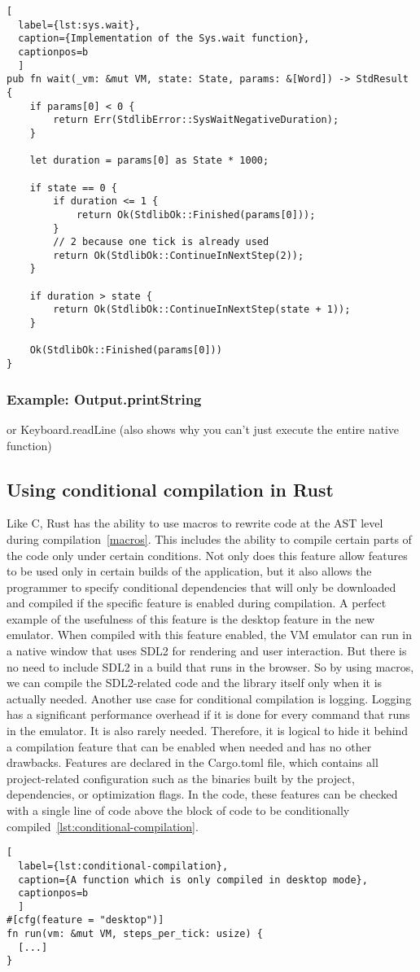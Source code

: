 \begin{lstlisting}[
  label={lst:sys.wait},
  caption={Implementation of the Sys.wait function},
  captionpos=b
  ]
pub fn wait(_vm: &mut VM, state: State, params: &[Word]) -> StdResult {
    if params[0] < 0 {
        return Err(StdlibError::SysWaitNegativeDuration);
    }

    let duration = params[0] as State * 1000;

    if state == 0 {
        if duration <= 1 {
            return Ok(StdlibOk::Finished(params[0]));
        }
        // 2 because one tick is already used
        return Ok(StdlibOk::ContinueInNextStep(2));
    }

    if duration > state {
        return Ok(StdlibOk::ContinueInNextStep(state + 1));
    }

    Ok(StdlibOk::Finished(params[0]))
}
\end{lstlisting}

\subsubsection{Example: Output.printString} \label{complex-example}
or Keyboard.readLine (also shows why you can't just execute the entire native function)

\subsection{Using conditional compilation in Rust} \label{conditional-compilation}
Like C, Rust has the ability to use macros to rewrite code at the AST level during compilation~\ref{macros}. This includes the ability to compile certain parts of the code only under certain conditions.
Not only does this feature allow features to be used only in certain builds of the application, but it also allows the programmer to specify conditional dependencies that will only be downloaded and compiled if the specific feature is enabled during compilation.
A perfect example of the usefulness of this feature is the desktop feature in the new emulator. When compiled with this feature enabled, the VM emulator can run in a native window that uses SDL2 for rendering and user interaction.
But there is no need to include SDL2 in a build that runs in the browser. So by using macros, we can compile the SDL2-related code and the library itself only when it is actually needed.
Another use case for conditional compilation is logging. Logging has a significant performance overhead if it is done for every command that runs in the emulator. It is also rarely needed. Therefore, it is logical to hide it behind a compilation feature that can be enabled when needed and has no other drawbacks. Features are declared in the Cargo.toml file, which contains all project-related configuration such as the binaries built by the project, dependencies, or optimization flags.
In the code, these features can be checked with a single line of code above the block of code to be conditionally compiled~\ref{lst:conditional-compilation}.

\begin{lstlisting}[
  label={lst:conditional-compilation},
  caption={A function which is only compiled in desktop mode},
  captionpos=b
  ]
#[cfg(feature = "desktop")]
fn run(vm: &mut VM, steps_per_tick: usize) {
  [...]
}
\end{lstlisting}
